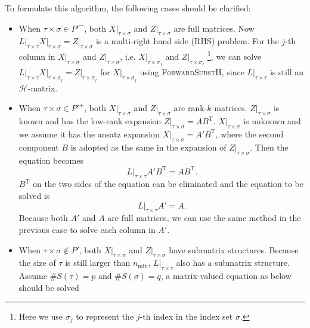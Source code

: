 \documentclass[11pt, a4paper]{book}
\begin{document}
To formulate this algorithm, the following cases should be clarified:
\begin{itemize}
\item When $\tau\times\sigma\in P'^-$, both $X \big\vert_{\tau\times\sigma}$ and
  $Z \big\vert_{\tau\times\sigma}$ are full matrices. Now
  $L \big\vert_{\tau\times\tau} X \big\vert_{\tau\times\sigma} = Z
  \big\vert_{\tau\times\sigma}$ is a multi-right hand side (RHS) problem. For the $j$-th
  column in $X \big\vert_{\tau\times\sigma}$ and $Z \big\vert_{\tau\times\sigma}$, i.e.
  $X \big\vert_{\tau\times\sigma_j}$ and $Z \big\vert_{\tau\times\sigma_j}$ \footnote{Here
    we use $\sigma_j$ to represent the $j$-th index in the index set $\sigma$.}, we can
  solve
  $L \big\vert_{\tau\times\tau} X \big\vert_{\tau\times\sigma_j} = Z
  \big\vert_{\tau\times\sigma_j}$ for $X \big\vert_{\tau\times\sigma_j}$ using
  \textsc{ForwardSubstH}, since $L \big\vert_{\tau\times\tau}$ is still an
  $\mathcal{H}$-matrix.
 \item When $\tau\times\sigma\in P'^+$, both $X \big\vert_{\tau\times\sigma}$ and
  $Z \big\vert_{\tau\times\sigma}$ are rank-$k$ matrices. $Z \big\vert_{\tau\times\sigma}$
  is known and has the low-rank expansion
  $Z \big\vert_{\tau\times\sigma} = A B^{\mathrm{T}}$. $X \big\vert_{\tau\times\sigma}$ is
  unknown and we assume it has the ansatz expansion
  $X \big\vert_{\tau\times\sigma} = A' B^{\mathrm{T}}$, where the second component $B$ is
  adopted as the same in the expansion of $Z \big\vert_{\tau\times\sigma}$. Then the
  equation becomes
  \begin{equation}
    L \big\vert_{\tau\times\tau} A' B^{\mathrm{T}} = A B^{\mathrm{T}}.
  \end{equation}
  $B^{\mathrm{T}}$ on the two sides of the equation can be eliminated and the equation to
  be solved is
  \begin{equation}
    L \big\vert_{\tau\times\tau} A' = A.
  \end{equation}
  Because both $A'$ and $A$ are full matrices, we can use the same method in the previous
  case to solve each column in $A'$.
\item When $\tau\times\sigma\notin P'$, both $X \big\vert_{\tau\times\sigma}$ and $Z
  \big\vert_{\tau\times\sigma}$ have submatrix structures. Because the size of $\tau$ is
  still larger than $n_{\min}$, $L \big\vert_{\tau\times\tau}$ also has a submatrix
  structure. Assume $\#S(\tau) = p$ and $\#S(\sigma) = q$, a matrix-valued equation as below should
  be solved
  \begin{equation}

\end{equation}
\end{itemize}
\end{document}
